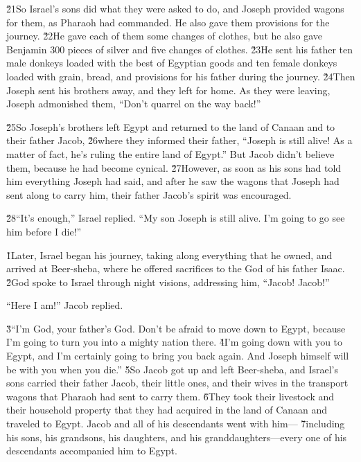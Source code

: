 \v{21}So Israel's sons did what they were asked to do, and Joseph provided wagons for them, as Pharaoh had commanded. He also gave them provisions for the journey. \v{22}He gave each of them some changes of clothes, but he also gave Benjamin 300 pieces of silver and five changes of clothes. \v{23}He sent his father ten male donkeys loaded with the best of Egyptian goods and ten female donkeys loaded with grain, bread, and provisions for his father during the journey. \v{24}Then Joseph sent his brothers away, and they left for home. As they were leaving, Joseph admonished them, ``Don't quarrel on the way back!''

\v{25}So Joseph's brothers left Egypt and returned to the land of Canaan and to their father Jacob, \v{26}where they informed their father, ``Joseph is still alive! As a matter of fact, he's ruling the entire land of Egypt.'' But Jacob didn't believe them, because he had become cynical. \v{27}However, as soon as his sons had told him everything Joseph had said, and after he saw the wagons that Joseph had sent along to carry him, their father Jacob's spirit was encouraged.

\v{28}``It's enough,'' Israel replied. ``My son Joseph is still alive. I'm going to go see him before I die!''

\v{1}Later, Israel began his journey, taking along everything that he owned, and arrived at Beer-sheba, where he offered sacrifices to the God of his father Isaac. \v{2}God spoke to Israel through night visions, addressing him, ``Jacob! Jacob!''

``Here I am!'' Jacob replied.

\v{3}``I'm God, your father's God. Don't be afraid to move down to Egypt, because I'm going to turn you into a mighty nation there. \v{4}I'm going down with you to Egypt, and I'm certainly going to bring you back again. And Joseph himself will be with you when you die.'' \v{5}So Jacob got up and left Beer-sheba, and Israel's sons carried their father Jacob, their little ones, and their wives in the transport wagons that Pharaoh had sent to carry them. \v{6}They took their livestock and their household property that they had acquired in the land of Canaan and traveled to Egypt. Jacob and all of his descendants went with him--- \v{7}including his sons, his grandsons, his daughters, and his granddaughters---every one of his descendants accompanied him to Egypt.

